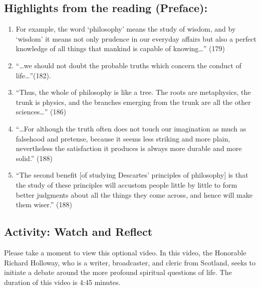 \documentclass[
]{book}
\providecommand{\tightlist}{%
  \setlength{\itemsep}{0pt}\setlength{\parskip}{0pt}}
\begin{document}
\hypertarget{highlights-from-the-reading-preface}{%
\subsection{Highlights from the reading (Preface):}\label{highlights-from-the-reading-preface}}

\begin{enumerate}
\def\labelenumi{\arabic{enumi}.}
\tightlist
\item
  For example, the word `philosophy' means the study of wisdom, and by `wisdom' it means not only prudence in our everyday affairs but also a perfect knowledge of all things that mankind is capable of knowing\ldots'' (179)
\item
  ``\ldots we should not doubt the probable truths which concern the conduct of life\ldots{}''(182).
\item
  ``Thus, the whole of philosophy is like a tree. The roots are metaphysics, the trunk is physics, and the branches emerging from the trunk are all the other sciences\ldots{}'' (186)
\item
  ``\ldots For although the truth often does not touch our imagination as much as falsehood and pretense, because it seems less striking and more plain, nevertheless the satisfaction it produces is always more durable and more solid.'' (188)
\item
  ``The second benefit {[}of studying Descartes' principles of philosophy{]} is that the study of these principles will accustom people little by little to form better judgments about all the things they come across, and hence will make them wiser.'' (188)
\end{enumerate}

\hypertarget{activity-watch-and-reflect-1}{%
\subsection*{Activity: Watch and Reflect}\label{activity-watch-and-reflect-1}}

\begin{reflect}
Please take a moment to view this optional video. In this video, the Honorable Richard Holloway, who is a writer, broadcaster, and cleric from Scotland, seeks to initiate a debate around the more profound spiritual questions of life. The duration of this video is 4:45 minutes.
\end{reflect}
\end{document}
